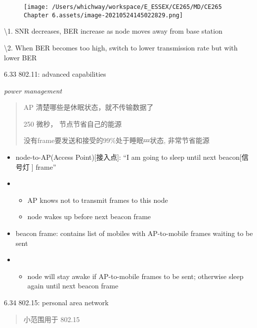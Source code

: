 \documentclass[
]{article}
\begin{document}
\begin{figure}
\centering
\texttt{[image: /Users/whichway/workspace/E\_ESSEX/CE265/MD/CE265 Chapter 6.assets/image-20210524145022829.png]}
\caption{}
\end{figure}

\textbackslash1. SNR decreases, BER increase as node moves away from
base station

\textbackslash2. When BER becomes too high, switch to lower transmission
rate but with lower BER

6.33 802.11: advanced capabilities

\emph{power management}

\begin{quote}
AP 清楚哪些是休眠状态，就不传输数据了

250 微秒， 节点节省自己的能源

没有frame要发送和接受的99\%处于睡眠💤状态, 非常节省能源
\end{quote}

\begin{itemize}
\item
  node-to-AP(Access Point){[}接入点{]}: ``I am going to sleep until next
  beacon{[}信号灯🚥{]} frame''
\item
  \begin{itemize}
  \item
    AP knows not to transmit frames to this node
  \item
    node wakes up before next beacon frame
  \end{itemize}
\item
  beacon frame: contains list of mobiles with AP-to-mobile frames
  waiting to be sent
\item
  \begin{itemize}
  \item
    node will stay awake if AP-to-mobile frames to be sent; otherwise
    sleep again until next beacon frame
  \end{itemize}
\end{itemize}

6.34 802.15: personal area network

\begin{quote}
小范围用于 802.15
\end{quote}
\end{document}
